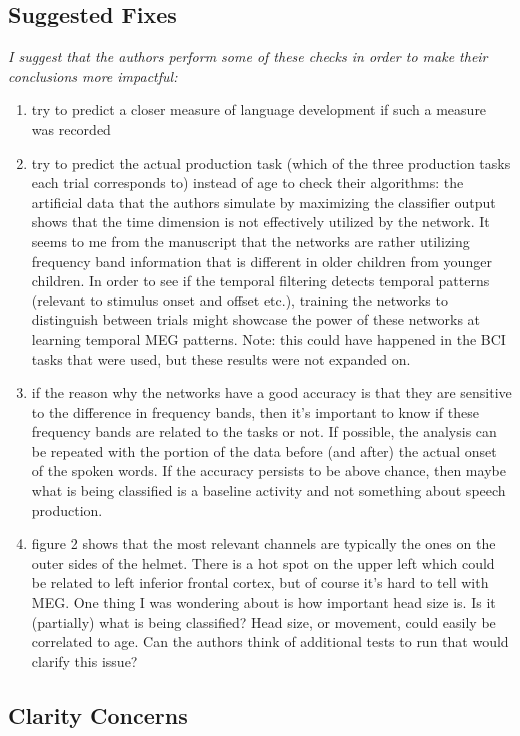 \documentclass{article}
\begin{document}
\subsection*{Suggested Fixes}
{\em I suggest that the authors perform some of these checks in order to make their conclusions more impactful:}
  \begin{enumerate}
  \item{try to predict a closer measure of language development if such a measure was recorded}
  \item{try to predict the actual production task (which of the three production tasks each trial corresponds to) instead of age to check their algorithms: the artificial data that the authors simulate by maximizing the classifier output shows that the time dimension is not effectively utilized by the network. It seems to me from the manuscript that the networks are rather utilizing frequency band information that is different in older children from younger children. In order to see if the temporal filtering detects temporal patterns (relevant to stimulus onset and offset etc.), training the networks to distinguish between trials might showcase the power of these networks at learning temporal MEG patterns. Note: this could have happened in the BCI tasks that were used, but these results were not expanded on.}
  \item{if the reason why the networks have a good accuracy is that they are sensitive to the difference in frequency bands, then it's important to know if these frequency bands are related to the tasks or not. If possible, the analysis can be repeated with the portion of the data before (and after) the actual onset of the spoken words. If the accuracy persists to be above chance, then maybe what is being classified is a baseline activity and not something about speech production.}
    \item{figure 2 shows that the most relevant channels are typically the ones on the outer sides of the helmet. There is a hot spot on the upper left which could be related to left inferior frontal cortex, but of course it's hard to tell with MEG. One thing I was wondering about is how important head size is. Is it (partially) what is being classified? Head size, or movement, could easily be correlated to age. Can the authors think of additional tests to run that would clarify this issue?}
  \end{enumerate}

\subsection*{Clarity Concerns}
\end{document}
